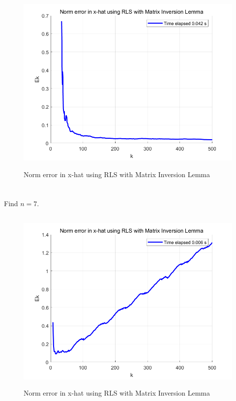 \documentclass{article}
\theoremstyle{definition} %
\begin{document}
\subsection{}
\begin{figure}[H]
    \centering
        \textsf{\includegraphics[width=0.6\columnwidth]{HW7-prob4-fig3.png}}
        \caption{Norm error in x-hat using RLS with Matrix Inversion Lemma}
        \label{fig: 4-3}
\end{figure}

\section{}
\subsection{}
Find $n=7$.

\subsection{}
\begin{figure}[H]
    \centering
        \textsf{\includegraphics[width=0.6\columnwidth]{HW7-prob5-fig1.png}}
        \caption{Norm error in x-hat using RLS with Matrix Inversion Lemma}
        \label{fig: 5-1}
\end{figure}
\end{document}
